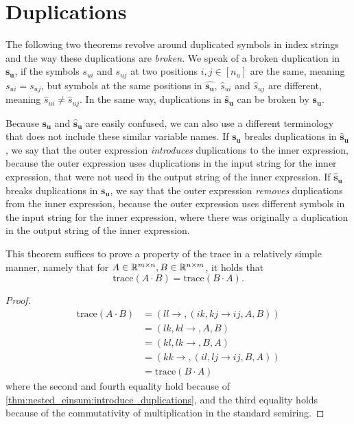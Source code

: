 \section{Duplications}

The following two theorems revolve around duplicated symbols in index strings and the way these duplications are \textit{broken}.
We speak of a broken duplication in $\bm{s_u}$, if the symbols $s_{ui}$ and $s_{uj}$ at two positions $i,j \in [n_u]$ are the same, meaning $s_{ui} = s_{uj}$,
but symbols at the same positions in $\bm{\hat{s_u}}$, $\hat{s}_{ui}$ and $\hat{s}_{uj}$ are different, meaning $\hat{s}_{ui} \neq \hat{s}_{uj}$.
In the same way, duplications in $\bm{\hat{s}_u}$ can be broken by $\bm{s_u}$.

Because $\bm{s_u}$ and $\bm{\hat{s}_u}$ are easily confused, we can also use a different terminology that does not include these similar variable names.
If $\bm{s_u}$ breaks duplications in $\bm{\hat{s}_u}$, we say that the outer expression \textit{introduces} duplications to the inner expression,
because the outer expression uses duplications in the input string for the inner expression, that were not used in the output string of the inner expression.
If $\bm{\hat{s}_u}$ breaks duplications in $\bm{s_u}$, we say that the outer expression \textit{removes} duplications from the inner expression,
because the outer expression uses different symbols in the input string for the inner expression, where there was originally a duplication in the output string of the inner expression.



This theorem suffices to prove a property of the trace in a relatively simple manner, namely that for $A \in \mathbb{R}^{m \times n}, B \in \mathbb{R}^{n \times m}$,
it holds that
$$\text{trace}(A \cdot B) = \text{trace}(B \cdot A).$$

\begin{proof}
    \small
    \begin{align*}
        \text{trace}(A \cdot B) & = (ll \rightarrow , (ik,kj \rightarrow ij, A, B))  \\
                                & = (lk, kl \rightarrow ,A, B)                       \\
                                & = (kl, lk \rightarrow ,B, A)                       \\
                                & = (kk \rightarrow , (il, lj \rightarrow ij, B, A)) \\
                                & = \text{trace}(B \cdot A)
    \end{align*}
    where the second and fourth equality hold because of \cref{thm:nested_einsum:introduce_duplications},
    and the third equality holds because of the commutativity of multiplication in the standard semiring.
\end{proof}
\bigskip



